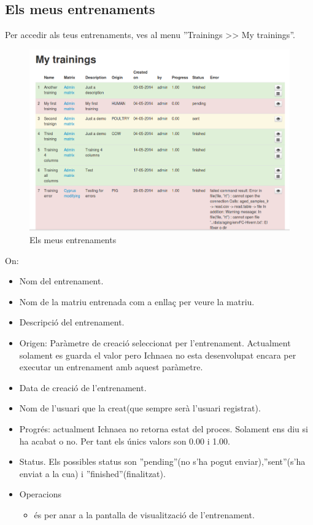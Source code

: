 \subsection{Els meus entrenaments}
\label{subsec:myTrainings}
Per accedir als teus entrenaments, ves al menu ''Trainings >> My trainings''.
\begin{figure}[h!]
  \centering
  \includegraphics[scale=0.4]{img/userguide/my_trainings.png}
  \caption{Els meus entrenaments}
  \label{fig:my_trainings}
\end{figure}
On:
\begin{itemize}
\item Nom del entrenament.
\item Nom de la matriu entrenada com a enllaç per veure la matriu.
\item Descripci\'{o} del entrenament.
\item Origen: Paràmetre de creació seleccionat per l'entrenament. Actualment solament es guarda el valor pero Ichnaea no esta desenvolupat encara per executar un entrenament amb aquest paràmetre.
\item Data de creaci\'{o} de l'entrenament.
\item Nom de l'usuari que la creat(que sempre serà l'usuari registrat).
\item Progr\'{e}s: actualment Ichnaea no retorna estat del proces. Solament ens diu si ha acabat o no. Per tant els \'{u}nics valors son 0.00 i 1.00.
\item Status. Els possibles status son ''pending''(no s'ha pogut enviar),''sent''(s'ha enviat a la cua) i ''finished''(finalitzat). 
\item Operacions
 \begin{itemize}
 \item \iconeyeopen \'{e}s per anar a la pantalla de visualització de l'entrenament.
 \end{itemize}
\end{itemize}

